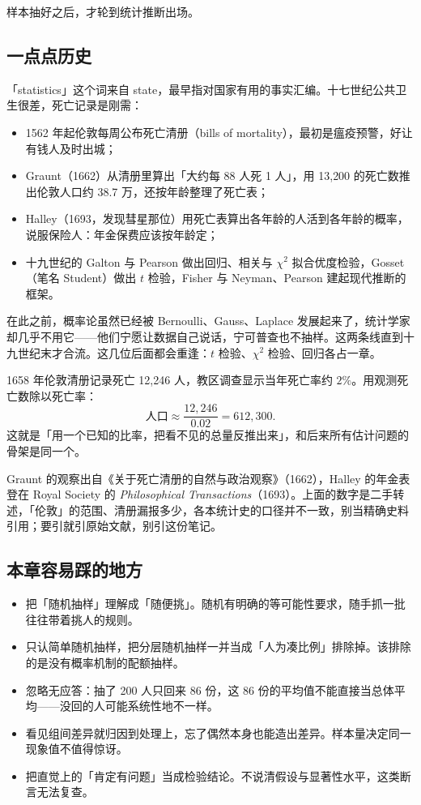 样本抽好之后，才轮到统计推断出场。

\subsection{一点点历史}

「statistics」这个词来自 state，最早指对国家有用的事实汇编。十七世纪公共卫生很差，死亡记录是刚需：

\begin{itemize}
 \item 1562 年起伦敦每周公布死亡清册（bills of mortality），最初是瘟疫预警，好让有钱人及时出城；
 \item Graunt（1662）从清册里算出「大约每 88 人死 1 人」，用 13{,}200 的死亡数推出伦敦人口约 38.7 万，还按年龄整理了死亡表；
 \item Halley（1693，发现彗星那位）用死亡表算出各年龄的人活到各年龄的概率，说服保险人：年金保费应该按年龄定；
 \item 十九世纪的 Galton 与 Pearson 做出回归、相关与 $\chi^2$ 拟合优度检验，Gosset（笔名 Student）做出 $t$ 检验，Fisher 与 Neyman、Pearson 建起现代推断的框架。
\end{itemize}

在此之前，概率论虽然已经被 Bernoulli、Gauss、Laplace 发展起来了，统计学家却几乎不用它——他们宁愿让数据自己说话，宁可普查也不抽样。这两条线直到十九世纪末才合流。这几位后面都会重逢：$t$ 检验、$\chi^2$ 检验、回归各占一章。

\begin{example}
1658 年伦敦清册记录死亡 12{,}246 人，教区调查显示当年死亡率约 $2\%$。用观测死亡数除以死亡率：
\[
\text{人口}\approx\frac{12{,}246}{0.02}=612{,}300 .
\]
这就是「用一个已知的比率，把看不见的总量反推出来」，和后来所有估计问题的骨架是同一个。
\end{example}

\begin{remark}[这一节的史料出处]
Graunt 的观察出自《关于死亡清册的自然与政治观察》（1662），Halley 的年金表登在 Royal Society 的 \emph{Philosophical Transactions}（1693）。上面的数字是二手转述，「伦敦」的范围、清册漏报多少，各本统计史的口径并不一致，别当精确史料引用；要引就引原始文献，别引这份笔记。
\end{remark}

\subsection*{本章容易踩的地方}

\begin{itemize}
 \item 把「随机抽样」理解成「随便挑」。随机有明确的等可能性要求，随手抓一批往往带着挑人的规则。
 \item 只认简单随机抽样，把分层随机抽样一并当成「人为凑比例」排除掉。该排除的是没有概率机制的配额抽样。
 \item 忽略无应答：抽了 200 人只回来 86 份，这 86 份的平均值不能直接当总体平均——没回的人可能系统性地不一样。
 \item 看见组间差异就归因到处理上，忘了偶然本身也能造出差异。样本量决定同一现象值不值得惊讶。
 \item 把直觉上的「肯定有问题」当成检验结论。不说清假设与显著性水平，这类断言无法复查。
\end{itemize}
